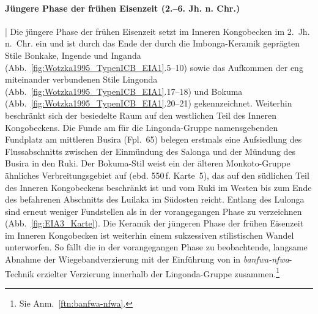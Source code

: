 \paragraph{Jüngere Phase der frühen Eisenzeit (2.--6. Jh. n. Chr.)}\hspace{-.5em}|\hspace{.5em}%
Die jüngere Phase der frühen Eisenzeit setzt im Inneren Kongobecken im 2.~Jh. n.~Chr. ein und ist durch das Ende der durch die Imbonga-Keramik geprägten Stile Bonkake, Ingende und Inganda (Abb.~\ref{fig:Wotzka1995_TypenICB_EIA1}.5--10) sowie das Aufkommen der eng miteinander verbundenen Stile Lingonda (Abb.~\ref{fig:Wotzka1995_TypenICB_EIA1}.17--18) und Bokuma (Abb.~\ref{fig:Wotzka1995_TypenICB_EIA1}.20--21) gekennzeichnet. Weiterhin beschränkt sich der besiedelte Raum auf den westlichen Teil des Inneren Kongobeckens. Die Funde am für die Lingonda-Gruppe namensgebenden Fundplatz am mittleren Busira (Fpl.~65) belegen erstmals eine Aufsiedlung des Flussabschnitts zwischen der Einmündung des Salonga und der Mündung des Busira in den Ruki. Der Bokuma-Stil \parencite[556\,f. Karte~8]{Wotzka.1995} weist ein der älteren Monkoto-Gruppe ähnliches Verbreitungsgebiet auf (ebd. 550\,f. Karte~5), das auf den südlichen Teil des Inneren Kongobeckens beschränkt ist und vom Ruki im Westen bis zum Ende des befahrenen Abschnitts des Luilaka im Südosten reicht. Entlang des Lulonga sind erneut weniger Fundstellen als in der vorangegangen Phase zu verzeichnen (Abb.~\ref{fig:EIA3_Karte}). Die Keramik der jüngeren Phase der frühen Eisenzeit im Inneren Kongobecken ist weiterhin einem sukzessiven stilistischen Wandel unterworfen. So fällt die in der vorangegangen Phase zu beobachtende, langsame Abnahme der Wiegebandverzierung mit der Einführung von in \textit{banfwa-nfwa}-Technik erzielter Verzierung innerhalb der Lingonda-Gruppe zusammen.\footnote{Sie Anm.~\ref{ftn:banfwa-nfwa}.}

